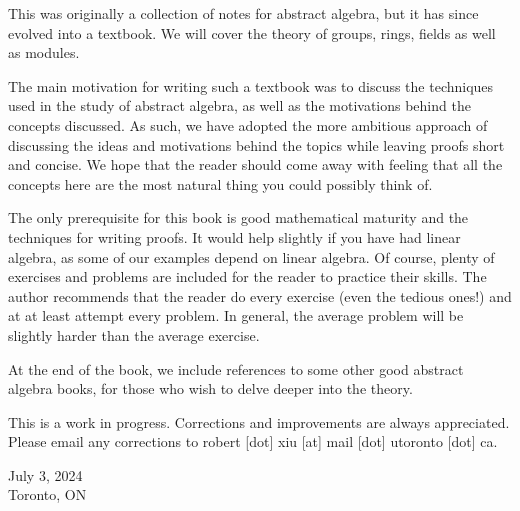 \documentclass[./main.tex]{subfiles}
\begin{document}
This was originally a collection of notes for abstract algebra, but it has since
evolved into a textbook. We will cover the theory of groups, rings, fields as
well as modules. 

The main motivation for writing such a textbook was to discuss the techniques
used in the study of abstract algebra, as well as the motivations behind the
concepts discussed. As such, we have adopted the more ambitious approach of
discussing the ideas and motivations behind the topics while leaving proofs
short and concise. We hope that the reader should come away with feeling that
all the concepts here are the most natural thing you could possibly think of.

The only prerequisite for this book is good mathematical maturity and the
techniques for writing proofs. It would help slightly if you have had
linear algebra, as some of our examples depend on linear algebra. Of course,
plenty of exercises and problems are included for the reader to practice
their skills. The author recommends that the reader do every exercise (even
the tedious ones!) and at at least attempt every problem. In general, the
average problem will be slightly harder than the average exercise.

At the end of the book, we include references to some other good abstract
algebra books, for those who wish to delve deeper into the theory.

This is a work in progress. Corrections and improvements are always
appreciated. Please email any corrections to robert [dot] xiu [at] mail
[dot] utoronto [dot] ca. 

July 3, 2024\\
Toronto, ON
\end{document}
